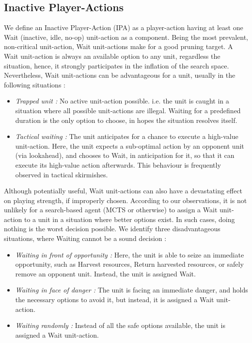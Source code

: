\documentclass[conference]{IEEEtran}
\begin{document}

\subsection{Inactive Player-Actions}

We define an Inactive Player-Action (IPA) as a player-action having at least one Wait (inactive, idle, no-op) unit-action as a component. Being the most prevalent, non-critical unit-action, Wait unit-actions make for a good pruning target. A Wait unit-action is always an available option to any unit, regardless the situation, hence, it strongly participates in the inflation of the search space. Nevertheless, Wait unit-actions can be advantageous for a unit, usually in the following situations :

\begin{itemize}
\item \textit{Trapped unit :} No active unit-action possible. i.e. the unit is caught in a situation where all possible unit-actions are illegal. Waiting for a predefined duration is the only option to choose, in hopes the situation resolves itself.
\item \textit{Tactical waiting :} The unit anticipates for a chance to execute a high-value unit-action. Here, the unit expects a sub-optimal action by an opponent unit (via lookahead), and chooses to Wait, in anticipation for it, so that it can execute its high-value action afterwards. This behaviour is frequently observed in tactical skirmishes.
\end{itemize}

Although potentially useful, Wait unit-actions can also have a devastating effect on playing strength, if improperly chosen. According to our observations, it is not unlikely for a search-based agent (MCTS or otherwise) to assign a Wait unit-action to a unit in a situation where better options exist. In such cases, doing nothing is the worst decision possible. We identify three disadvantageous situations, where Waiting cannot be a sound decision :

\begin{itemize}
\item \textit{Waiting in front of opportunity :} Here, the unit is able to seize an immediate opportunity, such as Harvest resources, Return harvested resources, or safely remove an opponent unit. Instead, the unit is assigned Wait.
\item \textit{Waiting in face of danger :} The unit is facing an immediate danger, and holds the necessary options to avoid it, but instead, it is assigned a Wait unit-action.
\item \textit{Waiting randomly :} Instead of all the safe options available, the unit is assigned a Wait unit-action.
\end{itemize}
\end{document}
